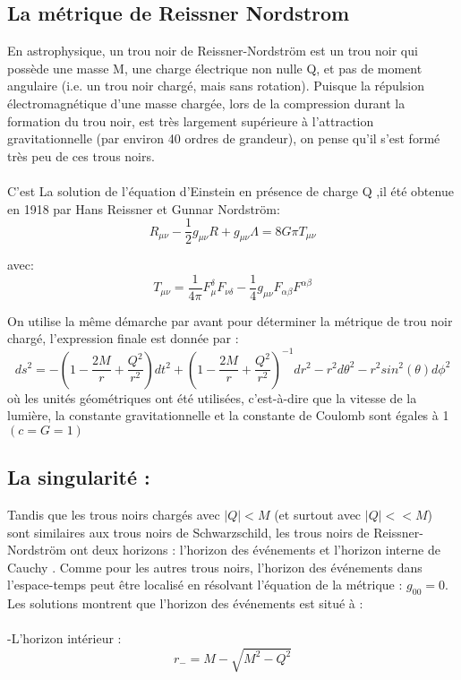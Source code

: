 \documentclass[12pt,  a4paper, openright]{report} %
\begin{document}
\subsection{La métrique de Reissner Nordstrom}
En astrophysique, un trou noir de Reissner-Nordström est un trou noir qui possède une masse M, une charge électrique non nulle Q, et pas de moment angulaire (i.e. un trou noir chargé, mais sans rotation). Puisque la répulsion électromagnétique d'une masse chargée, lors de la compression durant la formation du trou noir, est très largement supérieure à l'attraction gravitationnelle (par environ 40 ordres de grandeur), on pense qu'il s'est formé très peu de ces trous noirs.\\
\\
C'est La solution de l'équation d'Einstein en présence de charge Q \cite{7},il été obtenue en 1918 par Hans Reissner et Gunnar Nordström:\\
\begin{equation}
R_{\mu\nu}-\dfrac{1}{2}g_{\mu\nu}R+g_{\mu\nu}\Lambda=8G\pi T_{\mu\nu}
\end{equation}

avec:
\begin{equation}
T_{\mu\nu}=\dfrac{1}{4\pi}F_{\mu}^{\delta}F_{\nu\delta}-\dfrac{1}{4}g_{\mu\nu}F_{\alpha\beta}F^{\alpha\beta}
\end{equation}

On utilise la même démarche par avant pour déterminer la métrique de trou noir chargé,
l’expression finale est donnée par :
\begin{equation}
ds^{2}=-(1-\dfrac{2M}{r}+\dfrac{Q^{2}}{r^{2}})dt^{2}+(1-\dfrac{2M}{r}+\dfrac{Q^{2}}{r^{2}})^{-1}dr^{2}-r^{2}d\theta^{2}-r^{2}sin^{2}(\theta)d\phi^{2}
\end{equation}
où les unités géométriques ont été utilisées, c'est-à-dire que la vitesse de la lumière, la constante gravitationnelle et la constante de Coulomb sont égales à 1 $(c=G=1)$ 
\subsection*{La singularité :}
Tandis que les trous noirs chargés avec $|Q|<M$ (et surtout avec  $|Q|<< M$) sont similaires aux trous noirs de Schwarzschild, les trous noirs de Reissner-Nordström ont deux horizons : l'horizon des événements et l'horizon interne de Cauchy . Comme pour les autres trous noirs, l'horizon des événements dans l'espace-temps peut être localisé en résolvant l'équation de la métrique : $ g_{00}=0$. Les solutions montrent que l'horizon des événements est situé à :\\
\\
-L’horizon intérieur :
\begin{equation}
r_{-} = M -\sqrt{M^{2}-Q^{2}}
\end{equation}
\end{document}
